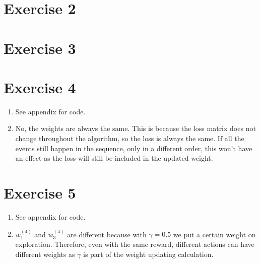 \documentclass[12pt]{article}
\begin{document}
\section*{Exercise 2}

\section*{Exercise 3}

\section*{Exercise 4}
\begin{enumerate}[label= (\alph*)]
	\item See \refname{appendix} for code.
        
    \item No, the weights are always the same. This is because the loss matrix does not change throughout the algorithm, so the loss is always the same. 
        If all the events still happen in the sequence, only in a different order, this won't have an effect as the loss will still be included in the updated weight.
\end{enumerate}

\section*{Exercise 5}
\begin{enumerate}[label=(\alph*)]
	\item See \refname{appendix} for code.
        
    \item \(w_1^{(4)}\) and \(w_3^{(4)}\) are different because with \(\gamma = 0.5\) we put a certain weight on exploration.
        Therefore, even with the same reward, different actions can have different weights as \(\gamma\) is part of the weight updating calculation.
\end{enumerate}
\end{document}
